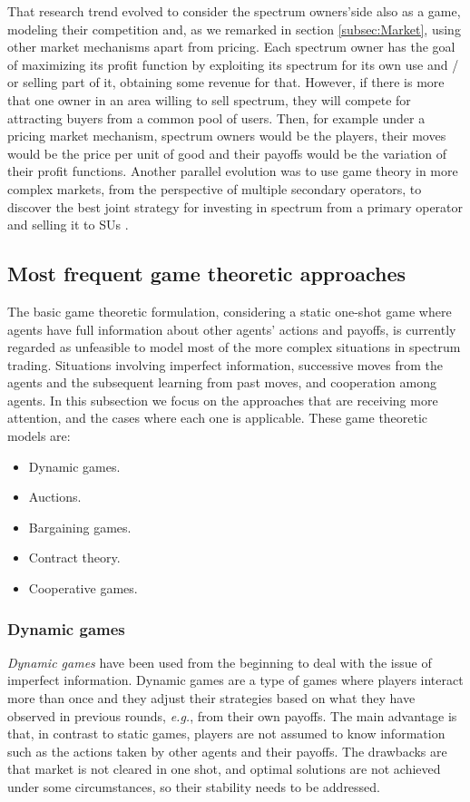 That research trend evolved to consider the spectrum owners'side also as a game, modeling their competition \cite{ref:Xing2007,ref:Maille2009,ref:Shen2013} and, as we remarked in section \ref{subsec:Market}, using other market mechanisms apart from pricing. 
Each spectrum owner has the goal of maximizing its profit function by exploiting its spectrum for its own use and / or selling part of it, obtaining some revenue for that. 
However, if there is more that one owner in an area willing to sell spectrum, they will compete for attracting buyers from a common pool of users. 
Then, for example under a pricing market mechanism, spectrum owners would be the players, their moves would be the price per unit of good and their payoffs would be the variation of their profit functions. 
Another parallel evolution was to use game theory in more complex markets, from the perspective of multiple secondary operators, to discover the best joint strategy for investing in spectrum from a primary operator and selling it to SUs \cite{ref:Jia2008_com,ref:Kim2011,ref:Zhu2012_Dyn}. 

\subsection{Most frequent game theoretic approaches}
The basic game theoretic formulation, considering a static one-shot game where agents have full information about other agents' actions and payoffs, is currently regarded as unfeasible to model most of the more complex situations in spectrum trading. Situations involving imperfect information, successive moves from the agents and the subsequent learning from past moves, and cooperation among agents.
In this subsection we focus on the approaches that are receiving more attention, and the cases where each one is applicable. These game theoretic models are:
\begin{itemize}
	\item Dynamic games.
	\item Auctions.
	\item Bargaining games.
	\item Contract theory.
	\item Cooperative games.
\end{itemize}

\subsubsection{Dynamic games}
\textit{Dynamic games} have been used from the beginning to deal with the issue of imperfect information. 
Dynamic games are a type of games where players interact more than once and they adjust their strategies based on what they have observed in previous rounds, \textit{e.g.}, from their own payoffs. 
The main advantage is that, in contrast to static games, players are not assumed to know information such as the actions taken by other agents and their payoffs. 
The drawbacks are that market is not cleared in one shot, and optimal solutions are not achieved under some circumstances, so their stability needs to be addressed. 

